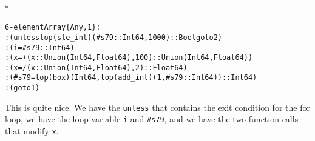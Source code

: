 \documentclass[letterpaper,10pt,english]{/Users/danluu/anaconda/lib/python2.7/site-packages/sphinx/texinputs/sphinxhowto}
\def\smaller{\fontsize{9.5pt}{9.5pt}\selectfont}
\newenvironment{InvisibleVerbatim}
        {\begin{mdframed}[leftmargin=0.1\linewidth,innerleftmargin=3pt,innerrightmargin=3pt, userdefinedwidth=1\linewidth, linewidth=0pt, linecolor=white, usetwoside=false]}
        {\end{mdframed}}
\begin{document}
                \makebox[0.1\linewidth]{\smaller\hfill\tt\color{nbframe-out-prompt}Out\hspace{4pt}{[}45{]}:\hspace{4pt}}\\*
                \vspace{-2.55\baselineskip}\begin{InvisibleVerbatim}
                \vspace{-0.5\baselineskip}
\begin{alltt}6-element Array\{Any,1\}:
 :(unless top(sle\_int)(\#s79::Int64,1000)::Bool goto 2)
 :(i = \#s79::Int64)
 :(x = +(x::Union(Int64,Float64),100)::Union(Int64,Float64))
 :(x = /(x::Union(Int64,Float64),2)::Float64)
 :(\#s79 = top(box)(Int64,top(add\_int)(1,\#s79::Int64))::Int64)
 :(goto 1)\end{alltt}

            \end{InvisibleVerbatim}
            
        
    
This is quite nice. We have the \texttt{unless} that contains the exit
condition for the for loop, we have the loop variable \texttt{i} and
\texttt{\#s79}, and we have the two function calls that modify
\texttt{x}.

\end{document}
